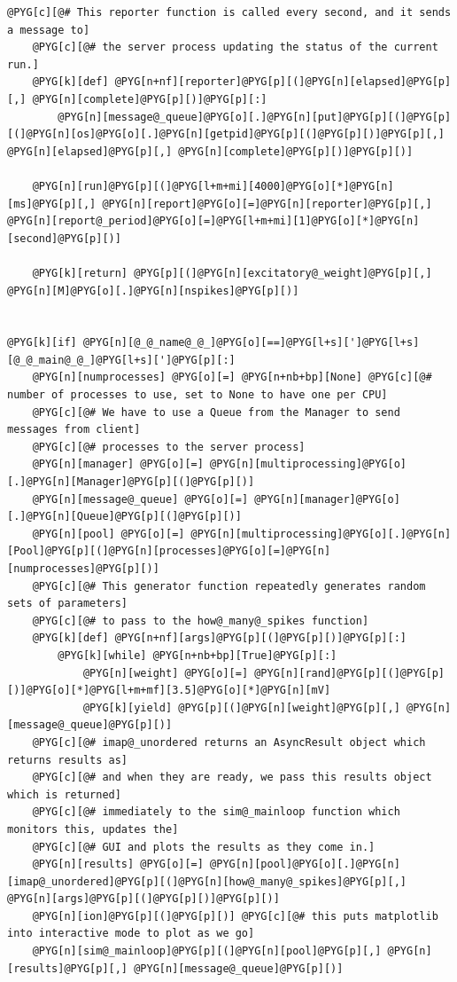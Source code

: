 \documentclass[letterpaper,10pt,english]{manual}
\begin{document}
\begin{Verbatim}[commandchars=@\[\]]
    @PYG[c][@# This reporter function is called every second, and it sends a message to]
    @PYG[c][@# the server process updating the status of the current run.]
    @PYG[k][def] @PYG[n+nf][reporter]@PYG[p][(]@PYG[n][elapsed]@PYG[p][,] @PYG[n][complete]@PYG[p][)]@PYG[p][:]
        @PYG[n][message@_queue]@PYG[o][.]@PYG[n][put]@PYG[p][(]@PYG[p][(]@PYG[n][os]@PYG[o][.]@PYG[n][getpid]@PYG[p][(]@PYG[p][)]@PYG[p][,] @PYG[n][elapsed]@PYG[p][,] @PYG[n][complete]@PYG[p][)]@PYG[p][)]

    @PYG[n][run]@PYG[p][(]@PYG[l+m+mi][4000]@PYG[o][*]@PYG[n][ms]@PYG[p][,] @PYG[n][report]@PYG[o][=]@PYG[n][reporter]@PYG[p][,] @PYG[n][report@_period]@PYG[o][=]@PYG[l+m+mi][1]@PYG[o][*]@PYG[n][second]@PYG[p][)]

    @PYG[k][return] @PYG[p][(]@PYG[n][excitatory@_weight]@PYG[p][,] @PYG[n][M]@PYG[o][.]@PYG[n][nspikes]@PYG[p][)]


@PYG[k][if] @PYG[n][@_@_name@_@_]@PYG[o][==]@PYG[l+s][']@PYG[l+s][@_@_main@_@_]@PYG[l+s][']@PYG[p][:]
    @PYG[n][numprocesses] @PYG[o][=] @PYG[n+nb+bp][None] @PYG[c][@# number of processes to use, set to None to have one per CPU]
    @PYG[c][@# We have to use a Queue from the Manager to send messages from client]
    @PYG[c][@# processes to the server process]
    @PYG[n][manager] @PYG[o][=] @PYG[n][multiprocessing]@PYG[o][.]@PYG[n][Manager]@PYG[p][(]@PYG[p][)]
    @PYG[n][message@_queue] @PYG[o][=] @PYG[n][manager]@PYG[o][.]@PYG[n][Queue]@PYG[p][(]@PYG[p][)]
    @PYG[n][pool] @PYG[o][=] @PYG[n][multiprocessing]@PYG[o][.]@PYG[n][Pool]@PYG[p][(]@PYG[n][processes]@PYG[o][=]@PYG[n][numprocesses]@PYG[p][)]
    @PYG[c][@# This generator function repeatedly generates random sets of parameters]
    @PYG[c][@# to pass to the how@_many@_spikes function]
    @PYG[k][def] @PYG[n+nf][args]@PYG[p][(]@PYG[p][)]@PYG[p][:]
        @PYG[k][while] @PYG[n+nb+bp][True]@PYG[p][:]
            @PYG[n][weight] @PYG[o][=] @PYG[n][rand]@PYG[p][(]@PYG[p][)]@PYG[o][*]@PYG[l+m+mf][3.5]@PYG[o][*]@PYG[n][mV]
            @PYG[k][yield] @PYG[p][(]@PYG[n][weight]@PYG[p][,] @PYG[n][message@_queue]@PYG[p][)]
    @PYG[c][@# imap@_unordered returns an AsyncResult object which returns results as]
    @PYG[c][@# and when they are ready, we pass this results object which is returned]
    @PYG[c][@# immediately to the sim@_mainloop function which monitors this, updates the]
    @PYG[c][@# GUI and plots the results as they come in.]
    @PYG[n][results] @PYG[o][=] @PYG[n][pool]@PYG[o][.]@PYG[n][imap@_unordered]@PYG[p][(]@PYG[n][how@_many@_spikes]@PYG[p][,] @PYG[n][args]@PYG[p][(]@PYG[p][)]@PYG[p][)]
    @PYG[n][ion]@PYG[p][(]@PYG[p][)] @PYG[c][@# this puts matplotlib into interactive mode to plot as we go]
    @PYG[n][sim@_mainloop]@PYG[p][(]@PYG[n][pool]@PYG[p][,] @PYG[n][results]@PYG[p][,] @PYG[n][message@_queue]@PYG[p][)]
\end{Verbatim}
\end{document}
